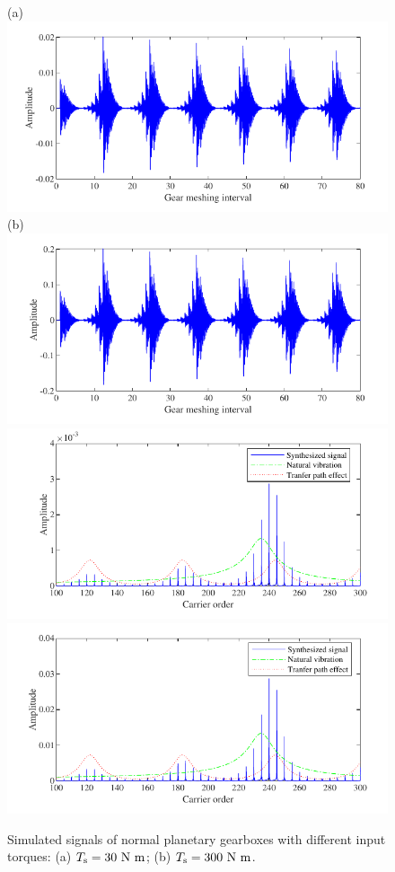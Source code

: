 \documentclass[a4paper,fleqn]{cas-sc}%
\begin{document}
\begin{figure}[pos=htbp]
    \centering
    (a) \includegraphics[scale=\myscale,valign=t]{Time_p5_normal_L30.pdf}
    (b) \includegraphics[scale=\myscale,valign=t]{Time_p5_normal_L300.pdf}\\
    \hspace*{1.5em}\includegraphics[scale=\myscale,valign=t]{Freq_p5_normal_L30.pdf}
    \hspace*{1.5em}\includegraphics[scale=\myscale,valign=t]{Freq_p5_normal_L300.pdf}
    \caption{Simulated signals of normal planetary gearboxes with different input torques: (a) $T_{\rm s}=30\ {\rm N\ m}$; (b) $T_{\rm s}=300\ {\rm N\ m}$.}
    \label{fig:simulated_p5_normal}
\end{figure}
\end{document}
